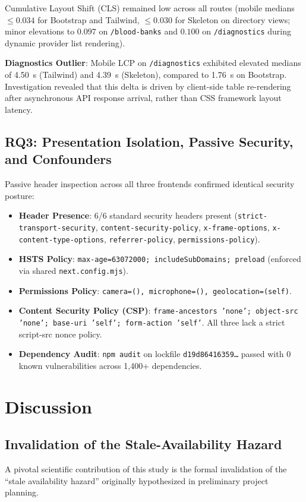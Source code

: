 \documentclass[conference]{IEEEtran}
\begin{document}
Cumulative Layout Shift (CLS) remained low across all routes (mobile medians $\le 0.034$ for Bootstrap and Tailwind, $\le 0.030$ for Skeleton on directory views; minor elevations to $0.097$ on \texttt{/blood-banks} and $0.100$ on \texttt{/diagnostics} during dynamic provider list rendering).

\textbf{Diagnostics Outlier}: Mobile LCP on \texttt{/diagnostics} exhibited elevated medians of 4.50~s (Tailwind) and 4.39~s (Skeleton), compared to 1.76~s on Bootstrap. Investigation revealed that this delta is driven by client-side table re-rendering after asynchronous API response arrival, rather than CSS framework layout latency.

\subsection{RQ3: Presentation Isolation, Passive Security, and Confounders}
Passive header inspection across all three frontends confirmed identical security posture:
\begin{itemize}
    \item \textbf{Header Presence}: 6/6 standard security headers present (\texttt{strict-transport-security}, \texttt{content-security-policy}, \texttt{x-frame-options}, \texttt{x-content-type-options}, \texttt{referrer-policy}, \texttt{permissions-policy}).
    \item \textbf{HSTS Policy}: \texttt{max-age=63072000; includeSubDomains; preload} (enforced via shared \texttt{next.config.mjs}).
    \item \textbf{Permissions Policy}: \texttt{camera=(), microphone=(), geolocation=(self)}.
    \item \textbf{Content Security Policy (CSP)}: \texttt{frame-ancestors 'none'; object-src 'none'; base-uri 'self'; form-action 'self'}. All three lack a strict script-src nonce policy.
    \item \textbf{Dependency Audit}: \texttt{npm audit} on lockfile \texttt{d19d86416359\dots} passed with 0 known vulnerabilities across 1,400+ dependencies.
\end{itemize}

\section{Discussion}

\subsection{Invalidation of the Stale-Availability Hazard}
A pivotal scientific contribution of this study is the formal invalidation of the ``stale availability hazard'' originally hypothesized in preliminary project planning.
\end{document}
